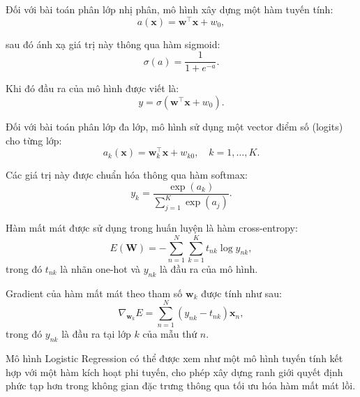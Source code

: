 Đối với bài toán phân lớp nhị phân, mô hình xây dựng một hàm tuyến tính:
\begin{equation}
  a(\boldsymbol{x}) = \boldsymbol{w}^{\intercal} \boldsymbol{x} + w_0,
\end{equation}

sau đó ánh xạ giá trị này thông qua hàm sigmoid: \begin{equation}
  \sigma(a) = \frac{1}{1 + e^{-a}}.
\end{equation}

Khi đó đầu ra của mô hình được viết là: \begin{equation}
  y = \sigma(\boldsymbol{w}^{\intercal} \boldsymbol{x} + w_0).
\end{equation}

Đối với bài toán phân lớp đa lớp, mô hình sử dụng một vector điểm số (logits)
cho từng lớp: \begin{equation}
  a_k(\boldsymbol{x}) = \boldsymbol{w}_k^{\intercal} \boldsymbol{x} + w_{k0},
  \quad k = 1, \dots, K.
\end{equation}

Các giá trị này được chuẩn hóa thông qua hàm softmax: \begin{equation}
  y_k = \frac{\exp(a_k)}{\sum_{j=1}^{K} \exp(a_j)}.
\end{equation}

Hàm mất mát được sử dụng trong huấn luyện là hàm cross-entropy:
\begin{equation}
  E(\boldsymbol{W}) = - \sum_{n=1}^{N} \sum_{k=1}^{K}t_{nk} \log y_{nk},
\end{equation} trong đó $t_{nk}$ là nhãn one-hot và $y_{nk}$ là đầu ra của mô
hình.

Gradient của hàm mất mát theo tham số $\boldsymbol{w}_k$ được tính như sau:
\begin{equation}
  \nabla_{\boldsymbol{w}_k} E =
  \sum_{n=1}^{N} (y_{nk} - t_{nk}) \boldsymbol{x}_n,
\end{equation} trong đó $y_{nk}$ là đầu ra tại lớp $k$ của mẫu thứ $n$.


Mô hình Logistic Regression có thể được xem như một mô hình tuyến tính kết hợp
với một hàm kích hoạt phi tuyến, cho phép xây dựng ranh giới quyết định phức
tạp hơn trong không gian đặc trưng thông qua tối ưu hóa hàm mất mát lồi.
